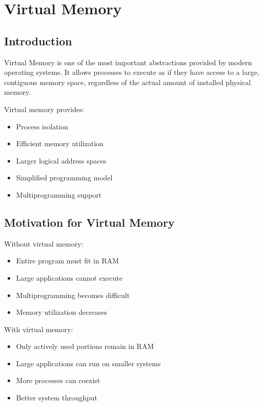 \chapter{Virtual Memory}

\section{Introduction}

Virtual Memory is one of the most important abstractions provided by modern operating systems. It allows processes to execute as if they have access to a large, contiguous memory space, regardless of the actual amount of installed physical memory.

Virtual memory provides:

\begin{itemize}
\item Process isolation
\item Efficient memory utilization
\item Larger logical address spaces
\item Simplified programming model
\item Multiprogramming support
\end{itemize}

\section{Motivation for Virtual Memory}

Without virtual memory:

\begin{itemize}
\item Entire program must fit in RAM
\item Large applications cannot execute
\item Multiprogramming becomes difficult
\item Memory utilization decreases
\end{itemize}

With virtual memory:

\begin{itemize}
\item Only actively used portions remain in RAM
\item Large applications can run on smaller systems
\item More processes can coexist
\item Better system throughput
\end{itemize}

